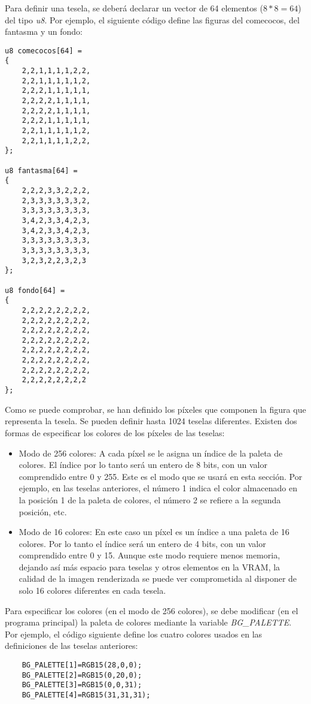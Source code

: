 Para definir una tesela, se deberá declarar un vector de 64 elementos ($8*8=64$) del tipo \textit{u8}. Por ejemplo, el siguiente código define las figuras del comecocos, del fantasma y un fondo:

\begin{lstlisting}
u8 comecocos[64] =
{
	2,2,1,1,1,1,2,2,
	2,2,1,1,1,1,1,2,
	2,2,2,1,1,1,1,1,
	2,2,2,2,1,1,1,1,
	2,2,2,2,1,1,1,1,
	2,2,2,1,1,1,1,1,
	2,2,1,1,1,1,1,2,
	2,2,1,1,1,1,2,2,
};

u8 fantasma[64] =
{
	2,2,2,3,3,2,2,2,
	2,3,3,3,3,3,3,2,
	3,3,3,3,3,3,3,3,
	3,4,2,3,3,4,2,3,
	3,4,2,3,3,4,2,3,
	3,3,3,3,3,3,3,3,
	3,3,3,3,3,3,3,3,
	3,2,3,2,2,3,2,3
};

u8 fondo[64] =
{
	2,2,2,2,2,2,2,2,
	2,2,2,2,2,2,2,2,
	2,2,2,2,2,2,2,2,
	2,2,2,2,2,2,2,2,
	2,2,2,2,2,2,2,2,
	2,2,2,2,2,2,2,2,
	2,2,2,2,2,2,2,2,
	2,2,2,2,2,2,2,2
};
\end{lstlisting}

Como se puede comprobar, se han definido los píxeles que componen la figura que representa la tesela. Se pueden definir hasta 1024 teselas diferentes. Existen dos formas de especificar los colores de los píxeles de las teselas:

\begin{itemize}
\item Modo de 256 colores: A cada píxel se le asigna un índice de la paleta de colores. El índice por lo tanto será un entero de 8 bits, con un valor comprendido entre 0 y 255. Este es el modo que se usará en esta sección. Por ejemplo, en las teselas anteriores, el número 1 indica el color almacenado en la posición 1 de la paleta de colores, el número 2 se refiere a la segunda posición, etc. 
%
\item Modo de 16 colores: En este caso un píxel es un índice a una paleta de 16 colores. Por lo tanto el índice será un entero de 4 bits, con un valor comprendido entre 0 y 15. Aunque este modo requiere menos memoria, dejando así más espacio para teselas y otros elementos en la VRAM, la calidad de la imagen renderizada se puede ver comprometida al disponer de solo 16 colores diferentes en cada tesela.
\end{itemize}

Para especificar los colores (en el modo de 256 colores), se debe modificar (en el programa principal) la paleta de colores mediante la variable \textit{BG\_PALETTE}. Por ejemplo, el código siguiente define los cuatro colores usados en las definiciones de las teselas anteriores:

\begin{lstlisting}
	BG_PALETTE[1]=RGB15(28,0,0);
	BG_PALETTE[2]=RGB15(0,20,0);
	BG_PALETTE[3]=RGB15(0,0,31);
	BG_PALETTE[4]=RGB15(31,31,31);
\end{lstlisting}


